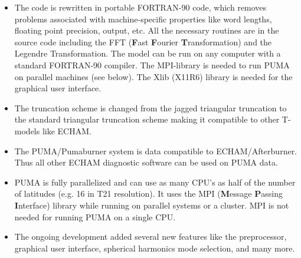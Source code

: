 \begin{itemize}
   \item The code is rewritten in portable
     FORTRAN-90 code, which removes problems associated with
     machine-specific properties like word lengths, floating point
     precision, output, etc. All the necessary routines are
     in the source code including the
     FFT ({\bf F}ast {\bf F}ourier {\bf T}ransformation)
     and the Legendre Transformation. The model can be run
     on any computer with a standard FORTRAN-90 compiler.
     The MPI-library is needed to run
     PUMA on parallel machines (see below).
     The Xlib (X11R6) library is needed for the graphical user
     interface.
   \item  The
     truncation scheme is changed from the jagged triangular truncation
     to the standard triangular truncation scheme making it compatible to other
     T-models like ECHAM.

   \item  The PUMA/Pumaburner system is data compatible to ECHAM/Afterburner.
     Thus all other ECHAM diagnostic software can be used on PUMA data.

   \item PUMA is fully parallelized and can use as many CPU's 
    as half of the number of latitudes (e.g. 16 in T21 resolution). It uses the MPI
    ({\bf M}essage {\bf P}assing {\bf I}nterface) library while
    running on parallel systems or a cluster.
    MPI is not needed for running PUMA on a single CPU.

   \item  The ongoing development added several new features like the preprocessor,
   graphical user interface, spherical harmonics mode selection, and many more.

\end{itemize}
